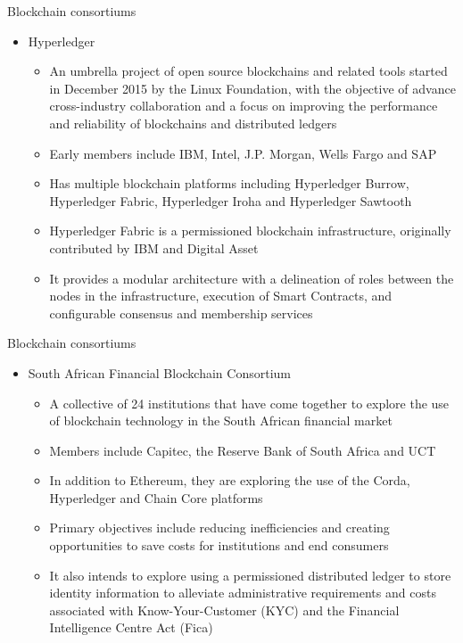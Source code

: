 \documentclass[10pt]{beamer}
\begin{document}

\begin{frame}{Blockchain consortiums}
	\begin{itemize}
		\item Hyperledger
		\begin{itemize}
			\item An umbrella project of open source blockchains and related tools started in December 2015 by the Linux Foundation, with the objective of advance cross-industry collaboration and a focus on improving the performance and reliability of blockchains and distributed ledgers
			\item Early members include IBM, Intel, J.P. Morgan, Wells Fargo and SAP
			\item Has multiple blockchain platforms including Hyperledger Burrow, Hyperledger Fabric, Hyperledger Iroha and Hyperledger Sawtooth
			\item Hyperledger Fabric is a permissioned blockchain infrastructure, originally contributed by IBM and Digital Asset
			\item It provides a modular architecture with a delineation of roles between the nodes in the infrastructure, execution of Smart Contracts, and configurable consensus and membership services
		\end{itemize}
	\end{itemize}
\end{frame}


\begin{frame}{Blockchain consortiums}
	\begin{itemize}
		\item South African Financial Blockchain Consortium
		\begin{itemize}
			\item A collective of 24 institutions that have come together to explore the use of blockchain technology in the South African financial market
			\item Members include Capitec, the Reserve Bank of South Africa and UCT
			\item In addition to Ethereum, they are exploring the use of the Corda, Hyperledger and Chain Core platforms
			\item Primary objectives include reducing inefficiencies and creating opportunities to save costs for institutions and end consumers
			\item It also intends to explore using a permissioned distributed ledger to store identity information to alleviate administrative requirements and costs associated with Know-Your-Customer (KYC) and the Financial Intelligence Centre Act (Fica)
		\end{itemize}
	\end{itemize}
\end{frame}
\end{document}
